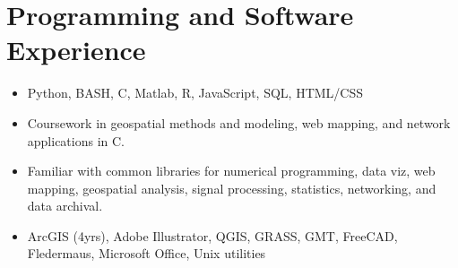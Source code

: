\section{Programming and Software Experience}
\begin{itemize}
\item Python, BASH, C, Matlab, R, JavaScript, SQL, HTML/CSS
\item Coursework in geospatial methods and modeling, web mapping, and network applications in C.
\item Familiar with common libraries for numerical programming, data viz,
  web mapping, geospatial analysis, signal processing, statistics, networking, and data archival. 
\item ArcGIS (4yrs), Adobe Illustrator, QGIS, GRASS, GMT, FreeCAD, Fledermaus, Microsoft Office, Unix utilities
\end{itemize}
